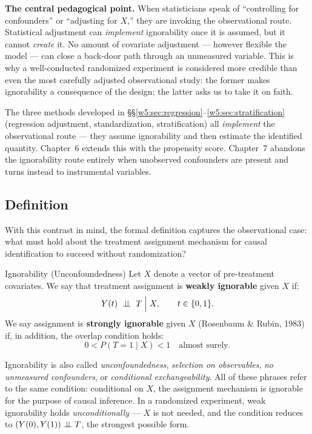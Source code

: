 \documentclass[master.tex]{subfiles}
\begin{document}
\medskip\noindent\textbf{The central pedagogical point.}  When
statisticians speak of ``controlling for confounders'' or ``adjusting
for $X$,'' they are invoking the observational route.  Statistical
adjustment can \emph{implement} ignorability once it is assumed, but it
cannot \emph{create} it.  No amount of covariate adjustment --- however
flexible the model --- can close a back-door path through an unmeasured
variable.  This is why a well-conducted randomized experiment is
considered more credible than even the most carefully adjusted
observational study: the former makes ignorability a consequence of the
design; the latter asks us to take it on faith.

\medskip\noindent The three methods developed in §§\ref{w5:sec:regression}--\ref{w5:sec:stratification}
(regression adjustment, standardization, stratification) all
\emph{implement} the observational route --- they assume ignorability
and then estimate the identified quantity.  Chapter~6 extends this with
the propensity score.  Chapter~7 abandons the ignorability route
entirely when unobserved confounders are present and turns instead to
instrumental variables.

\subsection{Definition}

With this contrast in mind, the formal definition captures the
observational case: what must hold about the treatment assignment
mechanism for causal identification to succeed without randomization?

\begin{defn}{Ignorability (Unconfoundedness)}
\label{w5:defn:ignorability}
Let $X$ denote a vector of pre-treatment covariates.  We say that
treatment assignment is \textbf{weakly ignorable} given $X$ if:
\[
  Y(t) \;\perp\!\!\!\perp\; T \;\Big|\; X, \qquad t \in \{0,1\}.
\]
We say assignment is \textbf{strongly ignorable} given $X$
(Rosenbaum \& Rubin, 1983) if, in addition, the overlap condition holds:
\[
  0 < P(T{=}1 \mid X) < 1 \quad \text{almost surely.}
\]
\end{defn}

\noindent Ignorability is also called \emph{unconfoundedness},
\emph{selection on observables}, \emph{no unmeasured confounders}, or
\emph{conditional exchangeability}.  All of these phrases refer to the
same condition: conditional on $X$, the assignment mechanism is
ignorable for the purpose of causal inference.  In a randomized
experiment, weak ignorability holds \emph{unconditionally} ---
$X$ is not needed, and the condition reduces to $(Y(0), Y(1)) \perp\!\!\!\perp T$,
the strongest possible form.
\end{document}
